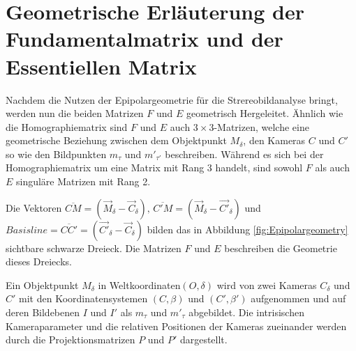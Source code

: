\section{Geometrische Erläuterung der Fundamentalmatrix und der Essentiellen Matrix }

Nachdem die Nutzen der Epipolargeometrie für die Strereobildanalyse bringt, werden nun die beiden Matrizen $F$ und $E$ geometrisch Hergeleitet. Ähnlich wie die Homographiematrix sind $F$ und $E$ auch $3 \times 3$-Matrizen, welche eine geometrische Beziehung zwischen dem Objektpunkt $M_\delta$, den Kameras $C$ und $C'$ so wie den Bildpunkten $m_\tau$ und $m'_{\tau'}$ beschreiben. Während es sich bei der Homographiematrix um eine Matrix mit Rang 3 handelt, sind sowohl $F$ als auch $E$ singuläre Matrizen mit Rang 2. 

Die Vektoren $\overline{CM} = (\vec{M}_\delta - \vec{C}_\delta),\, \overline{C'M} = (\vec{M}_\delta - \vec{C'}_\delta)$ und $Basisline = \overline{CC'} = (\vec{C'}_\delta - \vec{C}_\delta)$ bilden das in Abbildung \ref{fig:Epipolargeometry} sichtbare schwarze Dreieck. Die Matrizen $F$ und $E$ beschreiben die Geometrie dieses Dreiecks. 

Ein Objektpunkt $M_\delta$ in Weltkoordinaten$(O,\delta)$ wird von zwei Kameras $C_\delta$ und  $C'$ mit den Koordinatensystemen $(C,\beta)$ und $(C',\beta')$ aufgenommen und auf deren Bildebenen $I$ und $I'$ als $m_\tau$ und $m'_\tau$ abgebildet. Die intrisischen Kameraparameter und die relativen Positionen der Kameras zueinander werden durch die Projektionsmatrizen $P$ und $P'$ dargestellt.



 

